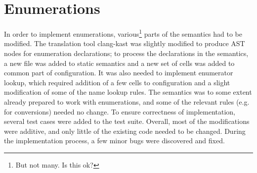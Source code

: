 \documentclass{fithesis3}
\begin{document}
\section{Enumerations}













In order to implement enumerations, various\footnote{But not many. Is this ok?} parts of the semantics had to be modified. The translation tool clang-kast was slightly modified to produce AST nodes for enumeration declarations; to process the declarations in the semantics, a new file was added to static semantics and a new set of cells was added to common part of configuration. It was also needed to implement enumerator lookup, which required addition of a few cells to configuration and a slight modification of some of the name lookup rules. The semantics was to some extent already prepared to work with enumerations, and some of the relevant rules (e.g. for conversions) needed no change. To ensure correctness of implementation, several test cases were added to the test suite. Overall, most of the modifications were additive, and only little of the existing code needed to be changed. During the implementation process, a few minor bugs were discovered and fixed. 
\end{document}
